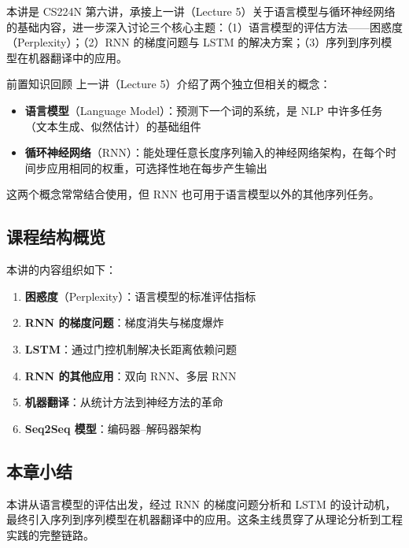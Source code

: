 \documentclass[a4paper]{article}
\begin{document}
本讲是 CS224N 第六讲，承接上一讲（Lecture 5）关于语言模型与循环神经网络的基础内容，进一步深入讨论三个核心主题：（1）语言模型的评估方法——困惑度（Perplexity）；（2）RNN 的梯度问题与 LSTM 的解决方案；（3）序列到序列模型在机器翻译中的应用。





\begin{knowledgebox}{前置知识回顾}
上一讲（Lecture 5）介绍了两个独立但相关的概念：
\begin{itemize}
    \item \textbf{语言模型}（Language Model）：预测下一个词的系统，是 NLP 中许多任务（文本生成、似然估计）的基础组件
    \item \textbf{循环神经网络}（RNN）：能处理任意长度序列输入的神经网络架构，在每个时间步应用相同的权重，可选择性地在每步产生输出
\end{itemize}
这两个概念常常结合使用，但 RNN 也可用于语言模型以外的其他序列任务。
\end{knowledgebox}

\subsection{课程结构概览}

本讲的内容组织如下：

\begin{enumerate}
    \item \textbf{困惑度}（Perplexity）：语言模型的标准评估指标
    \item \textbf{RNN 的梯度问题}：梯度消失与梯度爆炸
    \item \textbf{LSTM}：通过门控机制解决长距离依赖问题
    \item \textbf{RNN 的其他应用}：双向 RNN、多层 RNN
    \item \textbf{机器翻译}：从统计方法到神经方法的革命
    \item \textbf{Seq2Seq 模型}：编码器--解码器架构
\end{enumerate}

\subsection{本章小结}

本讲从语言模型的评估出发，经过 RNN 的梯度问题分析和 LSTM 的设计动机，最终引入序列到序列模型在机器翻译中的应用。这条主线贯穿了从理论分析到工程实践的完整链路。

\end{document}
